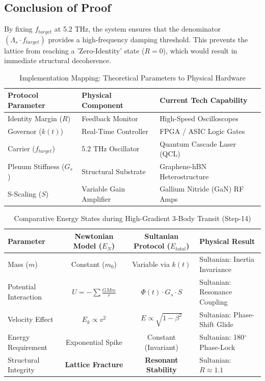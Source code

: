 \documentclass[11pt]{article}
\begin{document}
\subsection{Conclusion of Proof}
By fixing $f_{target}$ at 5.2 THz, the system ensures that the denominator $(\Lambda_s \cdot f_{target})$ provides a high-frequency damping threshold. This prevents the lattice from reaching a 'Zero-Identity' state ($R=0$), which would result in immediate structural decoherence.\\

\begin{table}[h]
\centering
\caption{Implementation Mapping: Theoretical Parameters to Physical Hardware}
\begin{tabular}{|l|l|l|}
\hline
\textbf{Protocol Parameter} & \textbf{Physical Component} & \textbf{Current Tech Capability} \\ \hline
Identity Margin ($R$) & Feedback Monitor & High-Speed Oscilloscopes \\ \hline
Governor ($k(t)$) & Real-Time Controller & FPGA / ASIC Logic Gates \\ \hline
Carrier ($f_{target}$) & 5.2 THz Oscillator & Quantum Cascade Laser (QCL) \\ \hline
Plenum Stiffness ($G_s$) & Structural Substrate & Graphene-hBN Heterostructure \\ \hline
S-Scaling ($S$) & Variable Gain Amplifier & Gallium Nitride (GaN) RF Amps \\ \hline
\end{tabular}
\end{table}

\begin{table}[h!]
\centering
\caption{Comparative Energy States during High-Gradient 3-Body Transit (Step-14)}
\label{tab:energy_comparison}
\begin{tabularx}{\textwidth}{@{} l c c X @{}}
\toprule
\textbf{Parameter} & \textbf{Newtonian Model ($E_N$)} & \textbf{Sultanian Protocol ($E_{total}$)} & \textbf{Physical Result} \\ \midrule
Mass ($m$) & Constant ($m_0$) & Variable via $k(t)$ & Sultanian: Inertia Invariance \\
Potential Interaction & $U = -\sum \frac{GMm}{r}$ & $\Phi(t) \cdot G_s \cdot S$ & Sultanian: Resonance Coupling \\
Velocity Effect & $E_k \propto v^2$ & $E \propto \sqrt{1-\beta^2}$ & Sultanian: Phase-Shift Glide \\
Energy Requirement & Exponential Spike & Constant (Invariant) & Sultanian: 180$^\circ$ Phase-Lock \\
Structural Integrity & \textbf{Lattice Fracture} & \textbf{Resonant Stability} & Sultanian: $R \approx 1.1$ \\ \bottomrule
\end{tabularx}
\end{table}
\end{document}
